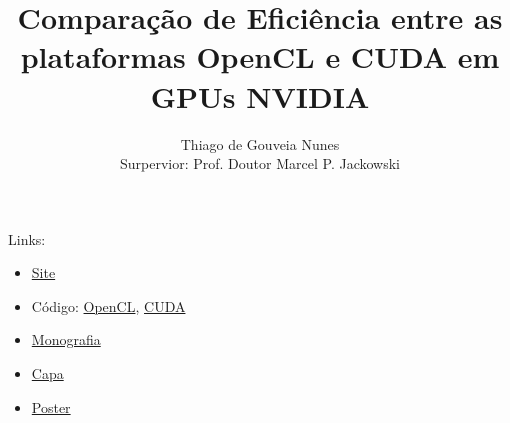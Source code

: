 \documentclass[a4paper,8pt]{article}
\title{Comparação de Eficiência entre as plataformas OpenCL e CUDA em GPUs NVIDIA}
\author{Thiago de Gouveia Nunes \\
        Surpervior: Prof. Doutor Marcel P. Jackowski}
\begin{document}
\maketitle

Links:
\begin{itemize}
  \item \href{http://www.linux.ime.usp.br/~gorobaum/mac499/}{Site}
  \item Código: \href{https://github.com/gorobaum/Testes-Opencl}{OpenCL}, \href{https://github.com/gorobaum/Testes-Cuda}{CUDA}
  \item \href{http://www.linux.ime.usp.br/~gorobaum/mac499/monografia.pdf}{Monografia}
  \item \href{http://www.linux.ime.usp.br/~gorobaum/mac499/capa.pdf}{Capa}
  \item \href{http://www.linux.ime.usp.br/~gorobaum/mac499/poster.pdf}{Poster}
\end{itemize}
\end{document}
